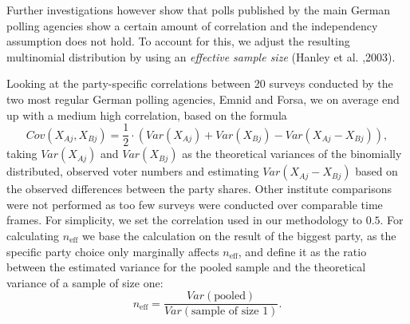 \documentclass[twoside]{report}
\begin{document}
Further investigations however show that polls published by the main German
polling agencies show a certain amount of correlation and the independency assumption
does not hold. To account for this, we adjust the resulting
multinomial distribution by using an \textit{effective sample size} (Hanley et al. ,2003).

Looking at the party-specific correlations between 20 surveys conducted by the two most regular German polling agencies, Emnid and Forsa, we on average end up with a medium high correlation, based on the formula
$$
Cov(X_{Aj}, X_{Bj}) = \frac{1}{2} \cdot \left(Var(X_{Aj}) + Var(X_{Bj}) - Var(X_{Aj} - X_{Bj}) \right),
$$
taking $Var(X_{Aj})$ and $Var(X_{Bj})$ as the theoretical variances of the binomially distributed, observed voter numbers and estimating $Var(X_{Aj} - X_{Bj})$ based on the observed differences between the party shares. Other institute comparisons were not performed as too few surveys were conducted over comparable time frames. For simplicity, we set the correlation used in our methodology to $0.5$. For calculating $n_{\text{eff}}$ we base the calculation on the result of the biggest party, as the specific party choice only marginally affects $n_{\text{eff}}$, and define it as the ratio between the estimated variance for the pooled sample and the theoretical variance of a sample of size one:
$$
n_{\text{eff}} = \frac{Var(\text{pooled})}{Var(\text{sample of size 1})}.
$$
\end{document}
